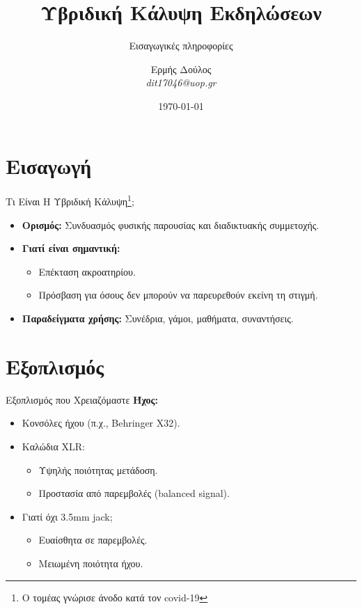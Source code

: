 \documentclass[aspectratio=169]{beamer}
\title{Υβριδική Κάλυψη Εκδηλώσεων}
\subtitle{Εισαγωγικές πληροφορίες}
\author{Ερμής Δούλος\\ \textit{dit17046@uop.gr}}
\date{\today}
\begin{document}
\frame{\titlepage}
\section{Εισαγωγή}
\begin{frame}{Τι Είναι Η Υβριδική Κάλυψη\footnote{Ο τομέας γνώρισε άνοδο κατά τον covid-19};}
  \begin{itemize}[<+->]
  \item \textbf{Ορισμός:} Συνδυασμός φυσικής παρουσίας και διαδικτυακής συμμετοχής.
  \item \textbf{Γιατί είναι σημαντική:}
    \begin{itemize}
    \item Επέκταση ακροατηρίου.
    \item Πρόσβαση για όσους δεν μπορούν να παρευρεθούν εκείνη τη στιγμή.
    \end{itemize}
  \item \textbf{Παραδείγματα χρήσης:} Συνέδρια, γάμοι, μαθήματα, συναντήσεις.
  \end{itemize}
\end{frame}

\section{Εξοπλισμός}
\begin{frame}{Εξοπλισμός που Χρειαζόμαστε}
  \textbf{Ήχος:}
  \begin{itemize}[<+->]
  \item Κονσόλες ήχου (π.χ., Behringer X32).
  \item Καλώδια XLR:
    \begin{itemize}
    \item Υψηλής ποιότητας μετάδοση.
    \item Προστασία από παρεμβολές (balanced signal).
    \end{itemize}
  \item Γιατί όχι 3.5mm jack;
    \begin{itemize}
    \item Ευαίσθητα σε παρεμβολές.
    \item Μειωμένη ποιότητα ήχου.
    \end{itemize}
  \end{itemize}
\end{frame}
\end{document}
